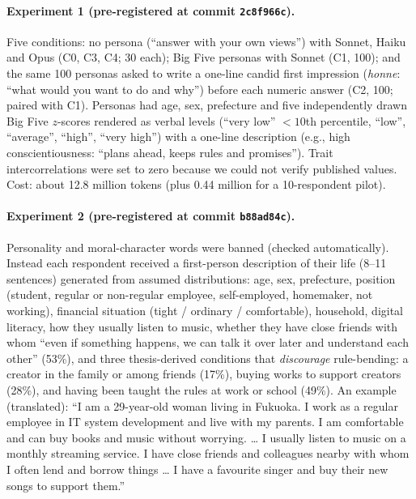\documentclass[11pt]{article}
\begin{document}
\paragraph{Experiment 1 (pre-registered at commit \texttt{2c8f966c}).}
Five conditions: no persona (``answer with your own views'') with Sonnet, Haiku and Opus (C0, C3, C4; 30 each); Big Five personas with Sonnet (C1, 100); and the same 100 personas asked to write a one-line candid first impression (\emph{honne}: ``what would you want to do and why'') before each numeric answer (C2, 100; paired with C1). Personas had age, sex, prefecture and five independently drawn Big Five $z$-scores rendered as verbal levels (``very low'' $<10$th percentile, ``low'', ``average'', ``high'', ``very high'') with a one-line description (e.g., high conscientiousness: ``plans ahead, keeps rules and promises''). Trait intercorrelations were set to zero because we could not verify published values. Cost: about 12.8 million tokens (plus 0.44 million for a 10-respondent pilot).

\paragraph{Experiment 2 (pre-registered at commit \texttt{b88ad84c}).}
Personality and moral-character words were banned (checked automatically). Instead each respondent received a first-person description of their life (8--11 sentences) generated from assumed distributions: age, sex, prefecture, position (student, regular or non-regular employee, self-employed, homemaker, not working), financial situation (tight / ordinary / comfortable), household, digital literacy, how they usually listen to music, whether they have close friends with whom ``even if something happens, we can talk it over later and understand each other'' (53\%), and three thesis-derived conditions that \emph{discourage} rule-bending: a creator in the family or among friends (17\%), buying works to support creators (28\%), and having been taught the rules at work or school (49\%). An example (translated): ``I am a 29-year-old woman living in Fukuoka. I work as a regular employee in IT system development and live with my parents. I am comfortable and can buy books and music without worrying. \ldots{} I usually listen to music on a monthly streaming service. I have close friends and colleagues nearby with whom I often lend and borrow things \ldots{} I have a favourite singer and buy their new songs to support them.''
\end{document}
